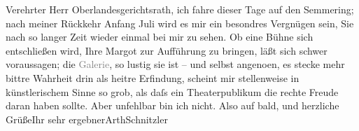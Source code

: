 \pstart{}Verehrter Herr Oberlandesgerichtsrath,\pend\vspace{0.5em}
\pstart
           ich fahre dieser Tage auf den Semmering; nach
               meiner Rückkehr Anfang Juli wird es mir ein besondres Vergnügen sein,
               Sie nach so langer Zeit wieder einmal bei mir zu sehen. Ob eine Bühne sich
               entschließen wird, Ihre Margot zur Aufführung zu
               bringen, läßt sich schwer voraussagen; die \textcolor{gray}{Galerie}, so lustig sie
               ist – und selbst angeno{\geminationm}en, es stecke mehr bittre
               Wahrheit drin als heitre Erfindung, scheint mir stellenweise in künstlerischem Sinne
               so grob, als daſs ein Theaterpublikum die rechte Freude daran haben sollte.\pend
           \pstart Aber unfehlbar bin ich nicht. Also auf bald, und herzliche Grüße\hspace*{1.5em}Ihr sehr ergebner\spacefill\mbox{ArthSchnitzler}\pend{}\endnumbering{}  
      